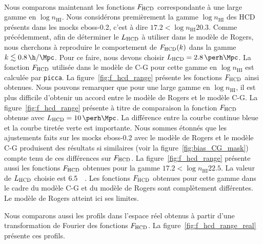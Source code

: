 \documentclass[11pt, twoside, a4paper, openright]{report}
\begin{document}
\paragraph{}
Nous comparons maintenant les fonctions $F_{\textsc{HCD}}$ correspondante à une large gamme en $\log n_{\mathrm{HI}}$.
Nous considérons premièrement la gamme $\log n_{\mathrm{HI}}$ des HCD présents dans les mocks eboss-0.2, c'est à dire $\num{17.2} < \log n_{\mathrm{HI}} \num{20.3}$. Comme précédemment, afin de déterminer le $L_{\textsc{HCD}}$ à utiliser dans le modèle de Rogers, nous cherchons à reproduire le comportement de $F_{\textsc{HCD}}(k)$ dans la gamme $k \lesssim \SI{0.8}{\h\per\Mpc}$. Pour ce faire, nous devons choisir $L_{\textsc{HCD}} = \SI{2.8}{\perh\Mpc}$.
La fonction $F_{\textsc{HCD}}$ utilisée dans le modèle de C-G pour cette gamme en $\log n_{\mathrm{HI}}$ est calculée par \texttt{picca}.
La figure~\ref{fig:f_hcd_range} présente les fonctions $F_{\textsc{HCD}}$ ainsi obtenues. Nous pouvons remarquer que pour une large gamme en $\log n_{\mathrm{HI}}$, il est plus difficile d'obtenir un accord entre le modèle de Rogers et le modèle C-G.
La figure~\ref{fig:f_hcd_range} présente à titre de comparaison la  fonction $F_{\textsc{HCD}}$ obtenue avec $L_{\textsc{HCD}} = \SI{10}{\perh\Mpc}$.
La différence entre la courbe continue bleue et la courbe tiretée verte est importante. Nous sommes étonnés que les ajustements faits sur les mocks eboss-0.2 avec le modèle de Rogers et le modèle C-G produisent des résultats si similaires (voir la figure~\ref{fig:bias_CG_mask}) compte tenu de ces différences sur $F_{\textsc{HCD}}$.
La figure~\ref{fig:f_hcd_range} présente aussi les fonctions $F_{\textsc{HCD}}$ obtenues pour la gamme $\num{17.2} < \log n_{\mathrm{HI}} \num{22.5}$. La valeur de $L_{\textsc{HCD}}$ choisie est \SI{6.5}{\perh\Mpc}. Les fonctions $F_{\textsc{HCD}}$ obtenues pour cette gamme dans le cadre du modèle C-G et du modèle de Rogers sont complètement différentes. Le modèle de Rogers atteint ici ses limites.

Nous comparons aussi les profils dans l'espace réel obtenus à partir d'une transformation de Fourier des fonctions $F_{\textsc{HCD}}$. La figure~\ref{fig:f_hcd_range_real} présente ces profils.
\end{document}

